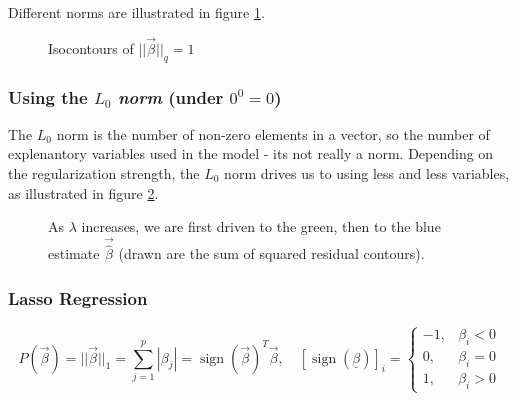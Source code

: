 Different norms are illustrated in figure \ref{fig:penalty_norms}.

\begin{figure}[!htb]
    \centering
    
    \caption{Isocontours of $||\vec{\beta}||_q = 1$}
    \label{fig:penalty_norms}
\end{figure}

\subsubsection{Using the $L_0$ \textit{norm} (under $0^0 = 0$)}
The $L_0$ norm is the number of non-zero elements in a vector, so the 
number of explenantory variables used in the model - its not really a norm. Depending on 
the regularization strength, the $L_0$ norm drives us to using
less and less variables, as illustrated in figure \ref{fig:l0_norm_reg}.

\begin{figure}[!htb]
    \centering
    
    \caption{As $\lambda$ increases, we are first driven to the green, then to the blue estimate $\vec{\hat{\beta}}$ (drawn
    are the sum of squared residual contours).}
    \label{fig:l0_norm_reg}
\end{figure}


\subsubsection{Lasso Regression}
\begin{equation}
    P(\vec{\beta}) = || \vec{\beta} ||_1 = \sum_{j=1}^p |\beta_j| = \operatorname{sign}(\vec{\beta})^T \vec{\beta}, \quad [\operatorname{sign}(\underline{\beta})]_i= \begin{cases}-1, & \beta_i<0 \\ 0, & \beta_i=0 \\ 1, & \beta_i>0\end{cases}
\end{equation}

